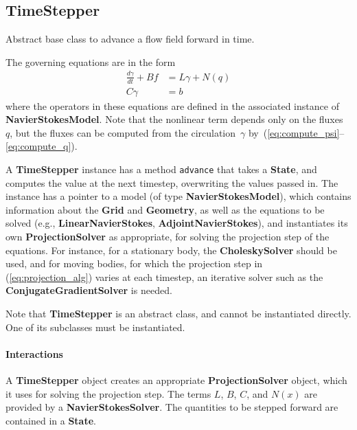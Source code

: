 \documentclass[11pt]{article}
\def\class#1{{\bf #1}} %
\def\fn#1{{\tt #1}} %
\begin{document}
\subsection{TimeStepper}
Abstract base class to advance a flow field forward in time.

The governing equations are in the form
\begin{equation}
\begin{aligned}
\frac{d\gamma}{dt} + Bf &= L\gamma + N(q)\\
C\gamma &= b
\end{aligned}
\label{eq:model}
\end{equation}
where the operators in these equations are defined in the associated instance of \class{NavierStokesModel}.  Note that the nonlinear term depends only on the fluxes~$q$, but the fluxes can be computed from the circulation~$\gamma$ by~(\ref{eq:compute_psi}--\ref{eq:compute_q}).

A \class{TimeStepper} instance has a method \fn{advance} that takes a \class{State}, and computes the value at the next timestep, overwriting the values passed in.  The instance has a pointer to a model (of type \class{NavierStokesModel}), which contains information about the \class{Grid} and \class{Geometry}, as well as the equations to be solved (e.g., \class{LinearNavierStokes}, \class{AdjointNavierStokes}), and instantiates its own \class{ProjectionSolver} as appropriate, for solving the projection step of the equations.  For instance, for a stationary body, the \class{CholeskySolver} should be used, and for moving bodies, for which the projection step in (\ref{eq:projection_alg}) varies at each timestep, an iterative solver such as the \class{ConjugateGradientSolver} is needed.

Note that \class{TimeStepper} is an abstract class, and cannot be instantiated directly.  One of its subclasses must be instantiated.

\paragraph{Interactions}
A \class{TimeStepper} object creates an appropriate \class{ProjectionSolver} object, which it uses for solving the projection step.  The terms $L$, $B$, $C$, and $N(x)$ are provided by a \class{NavierStokesSolver}.  The quantities to be stepped forward are contained in a \class{State}.
\end{document}
